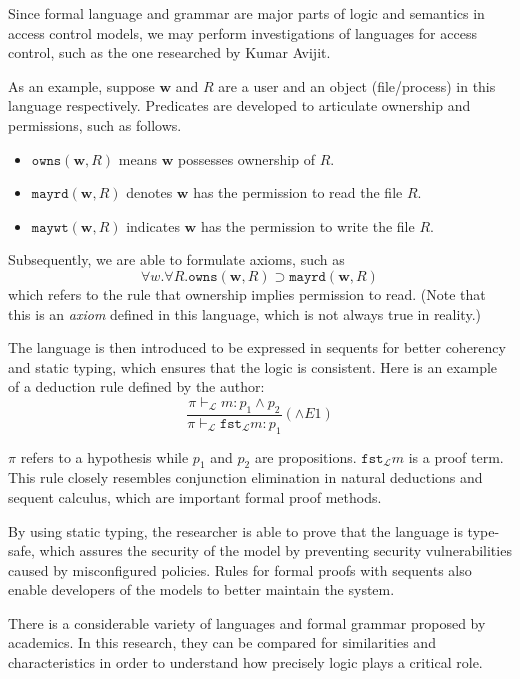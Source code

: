 \documentclass{article}
\begin{document}
Since formal language and grammar are major parts of logic and semantics in access control models, we may perform investigations of languages for access control, such as the one researched by Kumar Avijit.\cite{language}

As an example, suppose $\mathbf{w}$ and $R$ are a user and an object (file/process) in this language respectively. Predicates are developed to articulate ownership and permissions, such as follows.
\begin{itemize}
    \item $\texttt{owns}(\mathbf{w},R)$ means $\mathbf{w}$ possesses ownership of $R$.
    \item $\texttt{mayrd}(\mathbf{w},R)$ denotes $\mathbf{w}$ has the permission to read the file $R$.
    \item $\texttt{maywt}(\mathbf{w},R)$ indicates $\mathbf{w}$ has the permission to write the file $R$.
\end{itemize}

Subsequently, we are able to formulate axioms, such as
$$\forall w . \forall R . \texttt{owns}(\mathbf{w},R) \supset \texttt{mayrd}(\mathbf{w},R)$$
which refers to the rule that ownership implies permission to read. (Note that this is an \textit{axiom} defined in this language, which is not always true in reality.)

The language is then introduced to be expressed in sequents for better coherency and static typing, which ensures that the logic is consistent. Here is an example of a deduction rule defined by the author:
$$\frac{\pi \vdash_{\mathcal{L}} m : p_{1} \land p_{2}}{\pi \vdash_{\mathcal{L}} \texttt{fst}_{\mathcal{L}} m : p_{1}}(\land E1)$$

$\pi$ refers to a hypothesis while $p_{1}$ and $p_{2}$ are propositions. $\texttt{fst}_{\mathcal{L}} m$ is a proof term. This rule closely resembles conjunction elimination in natural deductions and sequent calculus, which are important formal proof methods.

By using static typing, the researcher is able to prove that the language is type-safe, which assures the security of the model by preventing security vulnerabilities caused by misconfigured policies. Rules for formal proofs with sequents also enable developers of the models to better maintain the system.\cite{language}

There is a considerable variety of languages and formal grammar proposed by academics. In this research, they can be compared for similarities and characteristics in order to understand how precisely logic plays a critical role.
\end{document}
